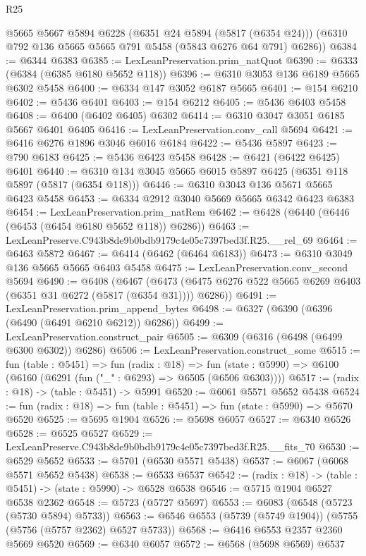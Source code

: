 \begin{lexlean}{R25}
\begin{coremodule}
      @5665
      @5667
      @5894
      @6228
      (@6351 @24 @5894 (@5817 (@6354 @24)))
      (@6310 @792 @136 @5665 @5665 @791 @5458 (@5843 @6276 @64 @791) @6286))
@6384 := @6344 @6383
@6385 := LexLeanPreservation.prim_natQuot
@6390 := @6333 (@6384 (@6385 @6180 @5652 @118))
@6396 := @6310 @3053 @136 @6189 @5665 @6302 @5458
@6400 := @6334 @147 @3052 @6187 @5665
@6401 := @154 @6210
@6402 := @5436 @6401
@6403 := @154 @6212
@6405 := @5436 @6403 @5458
@6408 := @6400 (@6402 @6405) @6302
@6414 := @6310 @3047 @3051 @6185 @5667 @6401 @6405
@6416 := LexLeanPreservation.conv_call @5694
@6421 := @6416 @6276 @1896 @3046 @6016 @6184
@6422 := @5436 @5897
@6423 := @790 @6183
@6425 := @5436 @6423 @5458
@6428 := @6421 (@6422 @6425) @6401
@6440 := @6310 @134 @3045 @5665 @6015 @5897 @6425 (@6351 @118 @5897 (@5817 (@6354 @118)))
@6446 := @6310 @3043 @136 @5671 @5665 @6423 @5458
@6453 := @6334 @2912 @3040 @5669 @5665 @6342 @6423 @6383
@6454 := LexLeanPreservation.prim_natRem
@6462 := @6428 (@6440 (@6446 (@6453 (@6454 @6180 @5652 @118)) @6286))
@6463 := LexLeanPreserve.C943b8de9b0bdb9179c4e05c7397bed3f.R25.__rel_69
@6464 := @6463 @5872
@6467 := @6414 (@6462 (@6464 @6183))
@6473 := @6310 @3049 @136 @5665 @5665 @6403 @5458
@6475 := LexLeanPreservation.conv_second @5694
@6490 := @6408
    (@6467 (@6473 (@6475 @6276 @522 @5665 @6269 @6403 (@6351 @31 @6272 (@5817 (@6354 @31)))) @6286))
@6491 := LexLeanPreservation.prim_append_bytes
@6498 := @6327 (@6390 (@6396 (@6490 (@6491 @6210 @6212)) @6286))
@6499 := LexLeanPreservation.construct_pair
@6505 := @6309 (@6316 (@6498 (@6499 @6300 @6302)) @6286)
@6506 := LexLeanPreservation.construct_some
@6515 := fun (table : @5451) =>
  fun (radix : @18) =>
  fun (state : @5990) => @6100 (@6160 (@6291 (fun ("_" : @6293) => @6505 (@6506 @6303))))
@6517 := (radix : @18) -> (table : @5451) -> @5991
@6520 := @6061 @5571 @5652 @5438
@6524 := fun (radix : @18) => fun (table : @5451) => fun (state : @5990) => @5670 @6520
@6525 := @5695 @1904
@6526 := @5698 @6057
@6527 := @6340 @6526
@6528 := @6525 @6527
@6529 := LexLeanPreserve.C943b8de9b0bdb9179c4e05c7397bed3f.R25.__fits_70
@6530 := @6529 @5652
@6533 := @5701 (@6530 @5571 @5438)
@6537 := @6067 (@6068 @5571 @5652 @5438)
@6538 := @6533 @6537
@6542 := (radix : @18) -> (table : @5451) -> (state : @5990) -> @6528 @6538
@6546 := @5715 @1904 @6527 @6538 @2362
@6548 := @5723 (@5727 @5697)
@6553 := @6083 (@6548 (@5723 (@5730 @5894) @5733))
@6563 := @6546 @6553 (@5739 (@5749 @1904)) (@5755 (@5756 (@5757 @2362) @6527 @5733))
@6568 := @6416 @6553 @2357 @2360 @5669 @6520
@6569 := @6340 @6057
@6572 := @6568 (@5698 @6569) @6537

\end{coremodule}
\end{lexlean}
